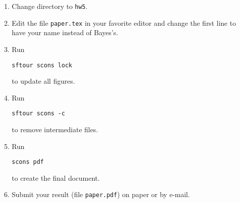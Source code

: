 \begin{enumerate}
\item Change directory to \texttt{hw5}.
\item Edit the file \texttt{paper.tex} in your favorite editor and change the
  first line to have your name instead of Bayes's.
\item Run
\begin{verbatim}
sftour scons lock
\end{verbatim}
to update all figures.
\item Run
\begin{verbatim}
sftour scons -c
\end{verbatim}
to remove intermediate files.
\item Run
\begin{verbatim}
scons pdf
\end{verbatim}
to create the final document.
\item Submit your result (file \texttt{paper.pdf}) on paper or by
e-mail.
\end{enumerate}



